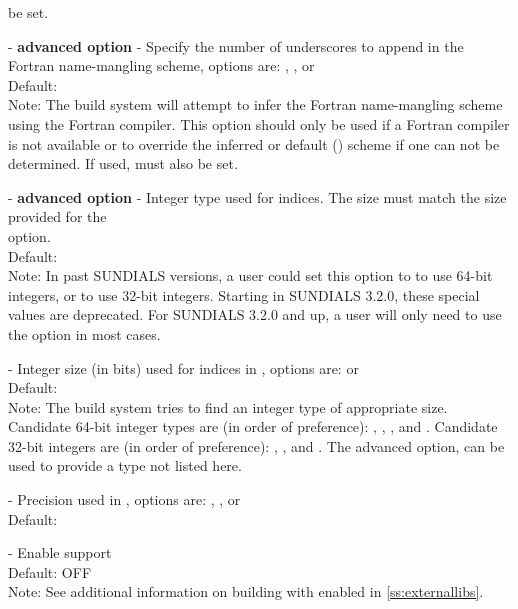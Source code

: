 \begin{description}
  be set.
\item[\id{SUNDIALS\_F77\_FUNC\_UNDERSCORES}] - \textbf{advanced option} -
  Specify the number of underscores to append in the Fortran
  name-mangling scheme, options are: , , or 
  \\
  Default:
  \\
  Note: The build system will attempt to infer the Fortran
  name-mangling scheme using the Fortran compiler. This option should
  only be used if a Fortran compiler is not available or to override
  the inferred or default () scheme if one can not be
  determined. If used,  must also be set.
\item[\id{SUNDIALS\_INDEX\_TYPE}] - \textbf{advanced option} -
  Integer type used for {\sundials} indices. The size must match the size provided for
  the \\ \noindent {} option.
  \\
  Default:
  \\
  Note:
  In past SUNDIALS versions, a user could set this option to  to use 64-bit
  integers, or  to use 32-bit integers. Starting in SUNDIALS 3.2.0, these
  special values are deprecated. For SUNDIALS 3.2.0 and up, a user will only need to use
  the  option in most cases.
\item[\id{SUNDIALS\_INDEX\_SIZE}] -
  Integer size (in bits) used for indices in {\sundials}, options are:  or 
  \\
  Default: 
  \\
  Note:
  The build system tries to find an integer type of appropriate size. Candidate 64-bit
  integer types are (in order of preference): , , , and .
  Candidate 32-bit integers are (in order of preference): , , and .
  The advanced option,  can be used to provide a type not listed here.
\item[\id{SUNDIALS\_PRECISION}] -
  Precision used in {\sundials}, options are: , , or 
  \\
  Default: 
\item[\id{SUPERLUDIST\_ENABLE}] -
  Enable {\superludist} support
  \\
  Default: OFF
  \\
  Note: See additional information on building with {\superludist} enabled
  in \ref{ss:externallibs}.

\end{description}
